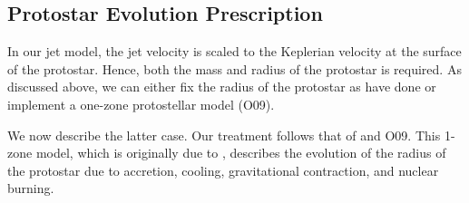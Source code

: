\documentclass[../dissertation.tex]{subfiles}
\begin{document}
\subsection{Protostar Evolution Prescription}\label{sec:jet_protostar evolution}

In our jet model, the jet velocity is scaled to the Keplerian velocity at the surface of the protostar.
Hence, both the mass and radius of the protostar is required.  As discussed above, we can either fix the radius of the protostar as \citet{2014ApJ...790..128F} have done or implement a one-zone protostellar model (O09).

We now describe the latter case. Our treatment follows that of \citet{2014MNRAS.439.3420M} and O09. %
This 1-zone model, which is originally due to \citet{2000ApJ...534..976N}, describes the evolution of the radius of the protostar due to accretion, cooling, gravitational contraction, and nuclear burning.


\end{document}
